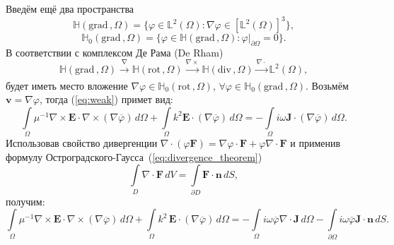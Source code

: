 \documentclass[a4paper,14pt]{article}
\begin{document}
Введём ещё два пространства~\citep{monk}
\begin{equation*}
	\mathbb{H}( \mathrm{grad}\,, \Omega ) = \lbrace \varphi \in \mathbb{L}^{2}(\Omega) : \nabla \varphi \in [ \mathbb{L}^{2}(\Omega) ]^{3} \rbrace , \label{eq:H_grad}
\end{equation*}
\begin{equation*}
	\mathbb{H}_{0}( \mathrm{grad}\,, \Omega ) = \lbrace \varphi \in \mathbb{H}( \mathrm{grad}\,, \Omega ) : \left. \varphi \right | _{\partial \Omega} = 0 \rbrace . \label{eq:H0_grad}
\end{equation*}
В соответствии с комплексом Де Рама (De Rham)~\citep{schwarzbach}
\begin{equation}
	\mathbb{H}( \mathrm{grad}\,, \Omega ) \xrightarrow[]{\nabla} \mathbb{H}( \mathrm{rot}\,, \Omega ) \xrightarrow[]{\nabla \times} \mathbb{H}( \mathrm{div}\,, \Omega ) \xrightarrow[]{\nabla \cdot} \mathbb{L}^{2}(\Omega) , \label{eq:derham}
\end{equation}
будет иметь место вложение $\nabla \varphi \in \mathbb{H}_{0}( \mathrm{rot}\,, \Omega )$, $\forall \varphi \in \mathbb{H}_{0}( \mathrm{grad}\,, \Omega )$. Возьмём $\mathbf{v} = \nabla \varphi$, тогда (\ref{eq:weak}) примет вид:
\begin{equation*}
	\int\limits_\Omega \mu^{-1} \nabla \times \mathbf{E} \cdot \nabla \times (\nabla \overline{\varphi}) \,d\Omega + \int\limits_\Omega k^{2} \mathbf{E} \cdot (\nabla \overline{\varphi}) \,d\Omega = - \int\limits_\Omega i \omega \mathbf{J} \cdot (\nabla \overline{\varphi}) \,d\Omega .
\end{equation*}
Использовав свойство дивергенции $\nabla \cdot (\varphi \mathbf{F}) = \nabla \varphi \cdot \mathbf{F} + \varphi \nabla \cdot \mathbf{F}$ и применив формулу Ос\-т\-ро\-г\-ра\-д\-с\-ко\-го-Гаусса~(\ref{eq:divergence_theorem})
\begin{equation}
	\int\limits_{D} \nabla \cdot \mathbf{F} \,dV = \int\limits_{\partial D} \mathbf{F} \cdot \mathbf{n} \,dS ,
	\label{eq:divergence_theorem}
\end{equation}
получим:
\begin{equation*}
	\int\limits_\Omega \mu^{-1} \nabla \times \mathbf{E} \cdot \nabla \times (\nabla \overline{\varphi}) \,d\Omega + \int\limits_\Omega k^{2}\, \mathbf{E} \cdot (\nabla \overline{\varphi}) \,d\Omega = - \int\limits_\Omega i \omega \overline{\varphi} \nabla \cdot \mathbf{J} \,d\Omega - \int\limits_{\partial \Omega} i \omega \overline{\varphi} \mathbf{J} \cdot \mathbf{n} \,d S .
\end{equation*}
\end{document}
